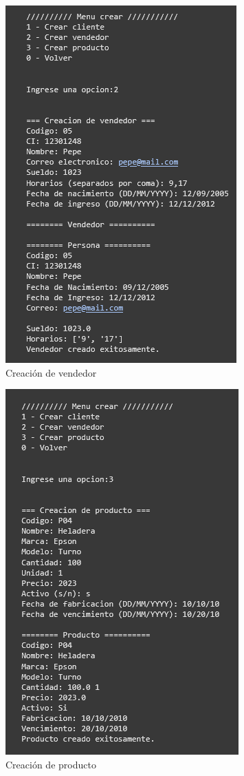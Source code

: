 \documentclass[11pt]{article}
\begin{document}
\begin{multicols}{2}
\begin{figure}[H]
    \centering
    \includegraphics[width=0.5\linewidth]{./anexos/evidencias/crearVendedor.png}
    \caption{Creación de vendedor}
    \label{fig:crearVendedor}
\end{figure}

\begin{figure}[H]
    \centering
    \includegraphics[width=0.5\linewidth]{./anexos/evidencias/crearProducto.png}
    \caption{Creación de producto}
    \label{fig:crearProducto}
\end{figure}


\end{multicols}
\end{document}
